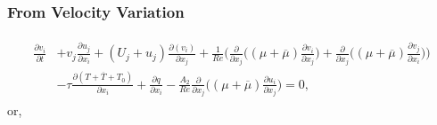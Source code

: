 \documentclass[preprint,12pt]{article}
\begin{document}
\subsubsection*{From Velocity Variation}
\begin{align}\label{eq:Adjoint_momentum}\begin{split}
\frac{\partial v_i}{\partial t}&+v_j\frac{\partial u_j}{\partial x_i}+(U_j+u_j)\frac{\partial (v_i)}{\partial x_j}+\frac{1}{Re}\Bigg(\frac{\partial}{\partial x_j}\Big(({\mu}+\overline{\mu})\frac{\partial v_i}{\partial x_j}\Big)+\frac{\partial}{\partial x_j}\Big(({\mu}+\overline{\mu})\frac{\partial v_j}{\partial x_i}\Big)\Bigg)\\&-\tau\frac{\partial (T+\overline{T}+T_0)}{\partial x_i}+\frac{\partial q}{\partial x_i}-\frac{A_2}{Re}\frac{\partial}{\partial x_j}\Big((\mu+\overline{\mu})\frac{\partial u_i}{\partial x_j}\Big)=0,
\end{split}
\end{align}
or,
\end{document}
